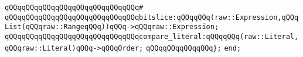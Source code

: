 \verb|qQQqqQQqqQQqqQQqqQQqqQQqqQQqqQQq#|\newline
\verb|qQQqqQQqqQQqqQQqqQQqqQQqqQQqqQQqbitslice:qQQqqQQq(raw::Expression,qQQqList(qQQqraw::RangeqQQq))qQQq->qQQqraw::Expression;|\newline
\newline
\verb|qQQqqQQqqQQqqQQqqQQqqQQqqQQqqQQqcompare_literal:qQQqqQQq(raw::Literal,qQQqraw::Literal)qQQq->qQQqOrder;|\newline
\verb|qQQqqQQqqQQqqQQq};|\newline
\verb|end;|\newline

